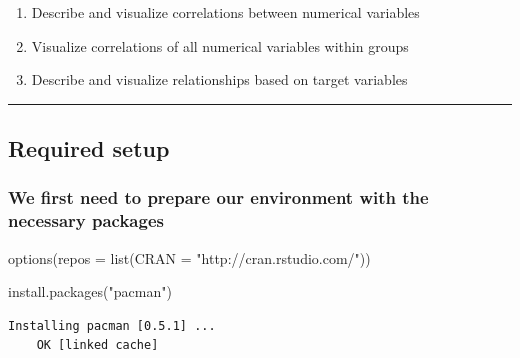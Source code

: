\documentclass[
  letterpaper,
  DIV=11,
  numbers=noendperiod]{scrreprt}
\newenvironment{Shaded}{\begin{snugshade}}{\end{snugshade}}
\newcommand{\AttributeTok}[1]{\textcolor[rgb]{0.40,0.45,0.13}{#1}}
\newcommand{\FunctionTok}[1]{\textcolor[rgb]{0.28,0.35,0.67}{#1}}
\newcommand{\NormalTok}[1]{\textcolor[rgb]{0.00,0.23,0.31}{#1}}
\newcommand{\StringTok}[1]{\textcolor[rgb]{0.13,0.47,0.30}{#1}}
\providecommand{\tightlist}{%
  \setlength{\itemsep}{0pt}\setlength{\parskip}{0pt}}\usepackage{longtable,booktabs,array}
\begin{document}
\begin{enumerate}
\def\labelenumi{\arabic{enumi}.}
\tightlist
\item
  Describe and visualize correlations between numerical variables
\item
  Visualize correlations of all numerical variables within groups
\item
  Describe and visualize relationships based on target variables
\end{enumerate}

\begin{center}\rule{0.5\linewidth}{0.5pt}\end{center}

\hypertarget{required-setup-4}{%
\subsection{Required setup}\label{required-setup-4}}

\hypertarget{we-first-need-to-prepare-our-environment-with-the-necessary-packages}{%
\subsubsection{We first need to prepare our environment with the
necessary
packages}\label{we-first-need-to-prepare-our-environment-with-the-necessary-packages}}

\begin{Shaded}
\begin{Highlighting}[]
\FunctionTok{options}\NormalTok{(}\AttributeTok{repos =} \FunctionTok{list}\NormalTok{(}\AttributeTok{CRAN =} \StringTok{"http://cran.rstudio.com/"}\NormalTok{))}

\FunctionTok{install.packages}\NormalTok{(}\StringTok{"pacman"}\NormalTok{)}
\end{Highlighting}
\end{Shaded}

\begin{verbatim}
Installing pacman [0.5.1] ...
    OK [linked cache]
\end{verbatim}
\end{document}
